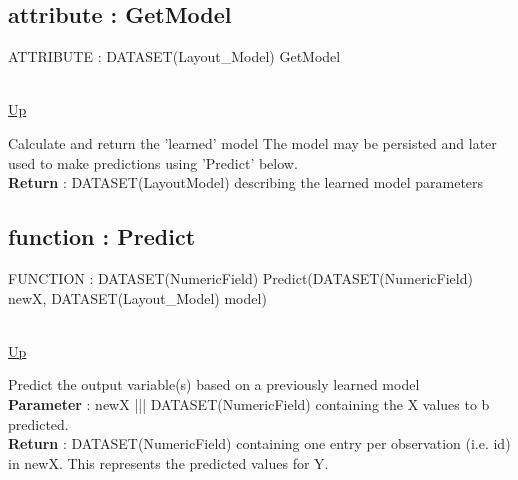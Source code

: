 \subsection*{attribute : GetModel}
\hypertarget{ecldoc:ml_core.interfaces.iregression.getmodel}{ATTRIBUTE : DATASET(Layout\_Model) GetModel} \\
\hyperlink{ecldoc:ml_core.interfaces.iregression}{Up} \\
\par
Calculate and return the 'learned' model The model may be persisted and later used to make predictions using 'Predict' below. \\
\textbf{Return} : DATASET(LayoutModel) describing the learned model parameters \\
\subsection*{function : Predict}
\hypertarget{ecldoc:ml_core.interfaces.iregression.predict}{FUNCTION : DATASET(NumericField) Predict(DATASET(NumericField) newX, DATASET(Layout\_Model) model)} \\
\hyperlink{ecldoc:ml_core.interfaces.iregression}{Up} \\
\par
Predict the output variable(s) based on a previously learned model \\
\textbf{Parameter} : newX ||| DATASET(NumericField) containing the X values to b predicted. \\
\textbf{Return} : DATASET(NumericField) containing one entry per observation (i.e. id) in newX. This represents the predicted values for Y. \\

